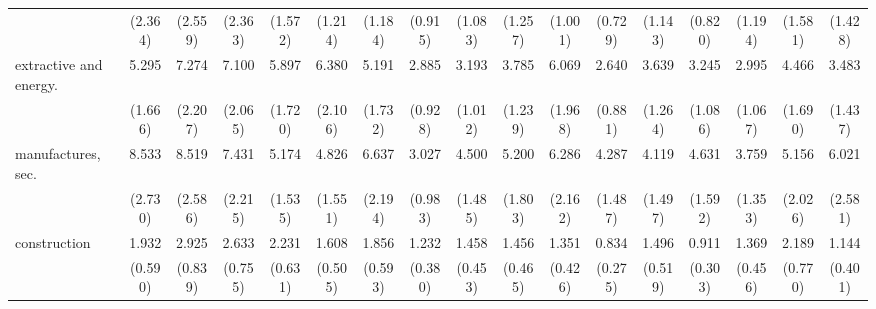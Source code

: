 {\begin{tabular}{l*{16}{c}}
                    &     (2.364)         &     (2.559)         &     (2.363)         &     (1.572)         &     (1.214)         &     (1.184)         &     (0.915)         &     (1.083)         &     (1.257)         &     (1.001)         &     (0.729)         &     (1.143)         &     (0.820)         &     (1.194)         &     (1.581)         &     (1.428)         \\
[1em]
extractive and energy.&       5.295\sym{***}&       7.274\sym{***}&       7.100\sym{***}&       5.897\sym{***}&       6.380\sym{***}&       5.191\sym{***}&       2.885\sym{***}&       3.193\sym{***}&       3.785\sym{***}&       6.069\sym{***}&       2.640\sym{**} &       3.639\sym{***}&       3.245\sym{***}&       2.995\sym{**} &       4.466\sym{***}&       3.483\sym{**} \\
                    &     (1.666)         &     (2.207)         &     (2.065)         &     (1.720)         &     (2.106)         &     (1.732)         &     (0.928)         &     (1.012)         &     (1.239)         &     (1.968)         &     (0.881)         &     (1.264)         &     (1.086)         &     (1.067)         &     (1.690)         &     (1.437)         \\
[1em]
manufactures, sec.  &       8.533\sym{***}&       8.519\sym{***}&       7.431\sym{***}&       5.174\sym{***}&       4.826\sym{***}&       6.637\sym{***}&       3.027\sym{***}&       4.500\sym{***}&       5.200\sym{***}&       6.286\sym{***}&       4.287\sym{***}&       4.119\sym{***}&       4.631\sym{***}&       3.759\sym{***}&       5.156\sym{***}&       6.021\sym{***}\\
                    &     (2.730)         &     (2.586)         &     (2.215)         &     (1.535)         &     (1.551)         &     (2.194)         &     (0.983)         &     (1.485)         &     (1.803)         &     (2.162)         &     (1.487)         &     (1.497)         &     (1.592)         &     (1.353)         &     (2.026)         &     (2.581)         \\
[1em]
construction        &       1.932\sym{*}  &       2.925\sym{***}&       2.633\sym{***}&       2.231\sym{**} &       1.608         &       1.856         &       1.232         &       1.458         &       1.456         &       1.351         &       0.834         &       1.496         &       0.911         &       1.369         &       2.189\sym{*}  &       1.144         \\
                    &     (0.590)         &     (0.839)         &     (0.755)         &     (0.631)         &     (0.505)         &     (0.593)         &     (0.380)         &     (0.453)         &     (0.465)         &     (0.426)         &     (0.275)         &     (0.519)         &     (0.303)         &     (0.456)         &     (0.770)         &     (0.401)         \\

\end{tabular}}
